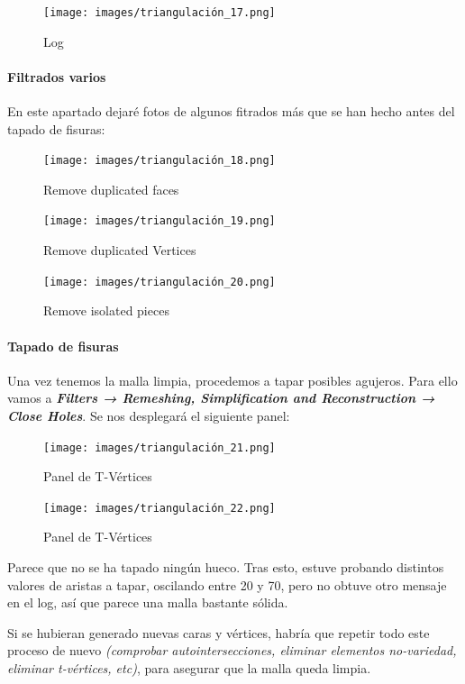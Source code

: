\documentclass[options]{article}
\begin{document}
\begin{figure}[H]
    \centering
    \texttt{[image: images/triangulación\_17.png]} 
    \caption{Log}
\end{figure}

\paragraph{Filtrados varios}

En este apartado dejaré fotos de algunos fitrados más que se han hecho antes del tapado de fisuras:

\begin{figure}[H]
    \centering
    \texttt{[image: images/triangulación\_18.png]}
    \caption{Remove duplicated faces}
\end{figure}

\begin{figure}[H]
    \centering
    \texttt{[image: images/triangulación\_19.png]}
    \caption{Remove duplicated Vertices}
\end{figure}
\begin{figure}[H]
    \centering
    \texttt{[image: images/triangulación\_20.png]}
    \caption{Remove isolated pieces}
\end{figure}

\paragraph{Tapado de fisuras}

Una vez tenemos la malla limpia, procedemos a tapar posibles agujeros. Para ello vamos a \textbf{\textit{Filters → Remeshing, Simplification and Reconstruction → Close Holes}}. Se nos desplegará el siguiente panel:

\begin{figure}[H]
    \centering
    \texttt{[image: images/triangulación\_21.png]}
    \caption{Panel de T-Vértices}
\end{figure}

\begin{figure}[H]
    \centering
    \texttt{[image: images/triangulación\_22.png]}
    \caption{Panel de T-Vértices}
\end{figure}

Parece que no se ha tapado ningún hueco. Tras esto, estuve probando distintos valores de aristas a tapar, oscilando entre 20 y 70, pero no obtuve otro mensaje en el log, así que parece una malla bastante sólida.

Si se hubieran generado nuevas caras y vértices, habría que repetir todo este proceso de nuevo \textit{(comprobar autointersecciones, eliminar elementos no-variedad, eliminar t-vértices, etc)}, para asegurar que la malla queda limpia.
\end{document}
